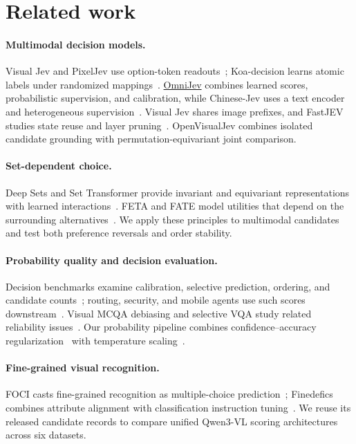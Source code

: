 \section{Related work}
\label{sec:related}
\paragraph{Multimodal decision models.}
Visual Jev and PixelJev use option-token readouts~\citep{yu_2026_visualjev,zhou_2026_pixeljev}; Koa-decision learns atomic labels under randomized mappings~\citep{dai_2026_koa}. \href{https://github.com/tinnel123666888/OmniJev}{OmniJev} combines learned scores, probabilistic supervision, and calibration, while Chinese-Jev uses a text encoder and heterogeneous supervision~\citep{wang_2026_chinesejev}. Visual Jev shares image prefixes, and FastJEV studies state reuse and layer pruning~\citep{yu_2026_visualjev,ma_2026_fastjev}. OpenVisualJev combines isolated candidate grounding with permutation-equivariant joint comparison.

\paragraph{Set-dependent choice.}
Deep Sets and Set Transformer provide invariant and equivariant representations with learned interactions~\citep{zaheer_2017_deepsets,lee_2019_set}. FETA and FATE model utilities that depend on the surrounding alternatives~\citep{pfannschmidt_2019_context}. We apply these principles to multimodal candidates and test both preference reversals and order stability.

\paragraph{Probability quality and decision evaluation.}
Decision benchmarks examine calibration, selective prediction, ordering, and candidate counts~\citep{deusser_2026_benchmark,rafe_2026_gates}; routing, security, and mobile agents use such scores downstream~\citep{li_2026_jevjudge,liu_2026_security,zhang_2026_jevmobile}. Visual MCQA debiasing and selective VQA study related reliability issues~\citep{atabuzzaman_2025_bias,eisenschlos_2024_selective}. Our probability pipeline combines confidence--accuracy regularization~\citep{liang_2020_dca,hebbalaguppe_2022_mdca} with temperature scaling~\citep{guo_2017_calibration}.

\paragraph{Fine-grained visual recognition.}
FOCI casts fine-grained recognition as multiple-choice prediction~\citep{geigle_2024_foci}; Finedefics combines attribute alignment with classification instruction tuning~\citep{he_2025_finedefics}. We reuse its released candidate records to compare unified Qwen3-VL scoring architectures across six datasets.
